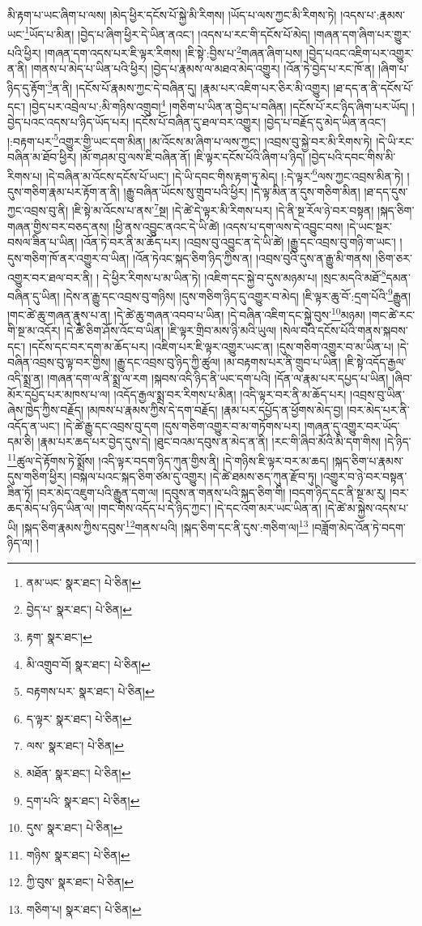 མི་རྟག་པ་ཡང་ཞིག་པ་ལས། །མེད་ཕྱིར་དངོས་པོ་སྐྱེ་མི་རིགས། །ཡོད་པ་ལས་ཀྱང་མི་རིགས་ཏེ། །འདས་པ་:རྣམས་ཡང་\footnote{ནམ་ཡང་  སྣར་ཐང་།  པེ་ཅིན། }ཡོད་པ་མིན། །བྱེད་པ་ཞིག་ཕྱིར་དེ་ཡིན་ནའང་། །འདས་པ་རང་གི་དངོས་པོ་མེད། །གཞན་དག་ཞིག་པར་གྱུར་པའི་ཕྱིར། །གཞན་དག་འདས་པར་ཇི་ལྟར་རིགས། །ཇི་སྟེ་:བྱིས་པ་\footnote{བྱེད་པ་  སྣར་ཐང་།  པེ་ཅིན། }གཞན་ཞིག་པས། །བྱེད་པའང་འཇིག་པར་འགྱུར་ན་ནི། །གནས་པ་མེད་པ་ཡིན་པའི་ཕྱིར། །བྱེད་པ་རྣམས་ལ་མཐའ་མེད་འགྱུར། །འོན་ཏེ་བྱེད་པ་རང་ཁོ་ན། །ཞིག་པ་ཉིད་དུ་རྟོག་\footnote{རྟག་  སྣར་ཐང་། }ན་ནི། །དངོས་པོ་རྣམས་ཀྱང་དེ་བཞིན་དུ། །རྣམ་པར་འཇིག་པར་ཅིར་མི་འགྱུར། །ཐ་དད་ན་ནི་དངོས་པོ་དང་། །བྱེད་པར་འབྲེལ་པ་:མི་གཉིས་འགྲུབ།\footnote{མི་འགྲུབ་བོ།  སྣར་ཐང་།  པེ་ཅིན། } །གཅིག་པ་ཡིན་ན་བྱེད་པ་བཞིན། །དངོས་པོ་རང་ཉིད་ཞིག་པར་ཡོད། །བྱེད་པའང་འདས་པ་ཉིད་ཡོད་པར། །དངོས་པོ་བཞིན་དུ་ཐལ་བར་འགྱུར། །བྱེད་པ་བརྗོད་དུ་མེད་ཡིན་ནའང་། །:བརྟག་པར་\footnote{བརྟགས་པར་  སྣར་ཐང་།  པེ་ཅིན། }འགྱུར་གྱི་ཡང་དག་མིན། །མ་འོངས་མ་ཞིག་པ་ལས་ཀྱང་། །འབྲས་བུ་སྐྱེ་བར་མི་རིགས་ཏེ། །དེ་ཡི་རང་བཞིན་མ་ཐོབ་ཕྱིར། །མོ་གཤམ་བུ་ལས་ཇི་བཞིན་ནོ། །ཇི་ལྟར་དངོས་པོའི་ཞིག་པ་ཉིད། །བྱེད་པའི་དབང་གིས་མི་རིགས་པ། །དེ་བཞིན་མ་འོངས་དངོས་པོ་ཡང་། །དེ་ཡི་དབང་གིས་རྟག་ཏུ་མེད། །:དེ་ལྟར་\footnote{ད་ལྟར་  སྣར་ཐང་།  པེ་ཅིན། }ལས་ཀྱང་འབྲས་མིན་ཏེ། །དུས་གཅིག་རྣམ་པར་རྟོག་ན་ནི། །རྒྱུ་བཞིན་ཡོངས་སུ་གྲུབ་པའི་ཕྱིར། །དེ་ལྟ་མིན་ན་དུས་གཅིག་མིན། །ཐ་དད་དུས་ཀྱང་འབྲས་བུ་ནི། །ཇི་སྟེ་མ་འོངས་པ་ནས་\footnote{ལས་  སྣར་ཐང་།  པེ་ཅིན། }སྔ། །དེ་ཚེ་དེ་ལྟར་མི་རིགས་པར། །དེ་ནི་སྔ་རོལ་ཉེ་བར་བསྟན། །སྐད་ཅིག་གཞན་གྱིས་བར་བཅད་ནས། །ཕྱི་ནས་འབྱུང་ནའང་དེ་ཡི་ཚེ། །འདས་པ་དག་ལས་དེ་འབྱུང་བས། །དེ་ཡང་སྔར་བསལ་ཟིན་པ་ཡིན། །འོན་ཏེ་བར་ནི་མ་ཆོད་པར། །འབྲས་བུ་འབྱུང་ན་དེ་ཡི་ཚེ། །རྒྱུ་དང་འབྲས་བུ་གཉི་ག་ཡང་། །དུས་གཅིག་ཁོ་ནར་འགྱུར་བ་ཡིན། །འོན་ཏེའང་སྐད་ཅིག་ཉིད་ཀྱིས་ན། །འབྲས་བུའི་དུས་ན་རྒྱུ་མི་གནས། །ཅིག་ཅར་འགྱུར་བར་ཐལ་བར་ནི། །
དེ་ཕྱིར་རིགས་པ་མ་ཡིན་ཏེ། །འཇིག་དང་སྐྱེ་བ་དུས་མཉམ་པ། །སྲང་མདའི་མཐོ་\footnote{མཐོན་  སྣར་ཐང་།  པེ་ཅིན། }དམན་བཞིན་དུ་ཡིན། །དེས་ན་རྒྱུ་དང་འབྲས་བུ་གཉིས། །དུས་གཅིག་ཉིད་དུ་འགྱུར་བ་མེད། །ཇི་ལྟར་ཆུ་བོ་:དྲག་པོའི་\footnote{དྲག་པའི་  སྣར་ཐང་།  པེ་ཅིན། }རྒྱུན། །གང་ཚེ་ཆུ་གཞན་རྣུས་པ་ན། །དེ་ཚེ་ཆུ་གཞན་འབབ་པ་ཡིན། །དེ་བཞིན་འཇིག་དང་སྐྱེ་བུས་\footnote{དུས་  སྣར་ཐང་།  པེ་ཅིན། }མཉམ། །གང་ཚེ་རང་གི་སྔ་མ་འདོར། །དེ་ཚེ་ཅིག་ཤོས་འོང་བ་ཡིན། །ཇི་ལྟར་གྲིབ་མས་ཉི་མའི་ཡུལ། །སེལ་བའི་དངོས་པོའི་གནས་སྐབས་དང་། །དངོས་དང་བར་དག་མ་ཆོད་པར། །འཇིག་པར་ཇི་ལྟར་འགྱུར་ཡང་ན། །དུས་གཅིག་འགྱུར་བ་མ་ཡིན་པ། །དེ་བཞིན་འབྲས་བུ་ལྟ་བར་གྱིས། །རྒྱུ་དང་འབྲས་བུ་ཉིད་ཀྱི་ཚུལ། །མ་བརྟགས་པར་ནི་གྲུབ་པ་ཡིན། །ཇི་སྟེ་འདོད་རྒྱལ་འདི་སྨྲ་ན། །གཞན་དག་ལ་ནི་སྨྲ་ལ་རག །སྐབས་འདི་ཉིད་ནི་ཡང་དག་པའི། །དོན་ལ་རྣམ་པར་དཔྱད་པ་ཡིན། །ཞིབ་མོར་དཔྱོད་པར་མཁས་པ་ལ། །འདོད་རྒྱལ་སྨྲ་བར་རིགས་པ་མིན། །འདི་ལྟར་བར་ནི་མ་ཆོད་པར། །འབྲས་བུ་ཡིན་ཞེས་ཁྱེད་ཀྱིས་བརྗོད། །མཁས་པ་རྣམས་ཀྱིས་དེ་དག་བརྗོད། །རྣམ་པར་དཔྱོད་ན་ཕྱོགས་མེད་བྱ། །བར་མེད་པར་ནི་འདོད་ན་ཡང་། །དེ་ཚེ་རྒྱུ་དང་འབྲས་བུ་དག །དུས་གཅིག་འགྱུར་བ་མ་གཏོགས་པར། །གཞན་དུ་འགྱུར་བར་ཡོད་དམ་ཅི། །རྣམ་པར་ཆད་པར་བྱེད་དུས་དེ། །ཐུང་བའམ་དབུས་ན་མེད་ན་ནི། །རང་གི་ཞིབ་མོའི་མི་དག་གིས། །དེ་ཉིད་\footnote{གཉིས་  སྣར་ཐང་།  པེ་ཅིན། }ཚུལ་དེ་རྟོགས་ཏེ་སྨྲོས། །འདི་ལྟར་བདག་ཉིད་ཀུན་གྱིས་ནི། །དེ་གཉིས་ཇི་ལྟར་བར་མ་ཆད། །སྐད་ཅིག་པ་རྣམས་དུས་གཅིག་ཕྱིར། །བསྐལ་པའང་སྐད་ཅིག་ཙམ་དུ་འགྱུར། །དེ་ཚེ་ཐམས་ཅད་ཀུན་རྫོབ་ཏུ། །འགྱུར་བ་ཉེ་བར་བསྟན་ཟིན་ཏོ། །བར་མེད་འཇུག་པའི་རྒྱུན་དག་ལ། །དབུས་ན་གནས་པའི་སྐད་ཅིག་གི། །བདག་ཉིད་དང་ནི་སྔ་མ་རུ། །བར་ཆད་མེད་པ་ཉིད་ཡིན་ལ། །གང་གིས་འདོད་པ་དེ་ཉིད་ཀྱང་། །དེ་དང་འོག་མར་ཡང་ཡིན་ན། །དེ་ཚེ་མ་སྐྱེས་འདས་པ་ཡི། །སྐད་ཅིག་རྣམས་ཀྱིས་དབུས་\footnote{ཀྱི་བུས་  སྣར་ཐང་།  པེ་ཅིན། }གནས་པའི། །སྐད་ཅིག་དང་ནི་དུས་:གཅིག་ལ།\footnote{གཅིག་པ།  སྣར་ཐང་།  པེ་ཅིན། } །བཟློག་མེད་འོན་ཏེ་བདག་ཉིད་ལ། །

